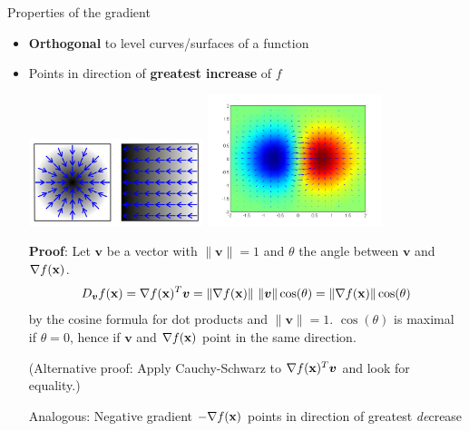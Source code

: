 \documentclass[11pt,compress,t,notes=noshow, xcolor=table]{beamer}
\begin{document}
\begin{vbframe}{Properties of the gradient}

\begin{itemize}
	\item \textbf{Orthogonal} to level curves/surfaces of a function
	\item Points in direction of \textbf{greatest increase} of $f$
	\begin{center}
		\includegraphics[width = 0.4\textwidth]{figure_man/gradient3.png} \includegraphics[width = 0.4\textwidth]{figure_man/gradient.png}
	\end{center}
	\begin{footnotesize}
    	\textbf{Proof}: Let $\bm{v}$ be a vector with $\|\bm{v}\|=1$ and $\theta$ the angle between $\bm{v}$ and $\nabla f(\mathbf{x})$. 
        \begin{equation*}
            D_{\bm{v}}f(\mathbf{x}) = \nabla f(\mathbf{x})^T \bm{v} = \|\nabla f(\mathbf{x})\|~\|\bm{v}\|\cos(\theta) = \|\nabla f(\mathbf{x})\| \cos(\theta)
        \end{equation*}
    	by the cosine formula for dot products and $\|\bm{v}\| = 1$.
        $\cos(\theta)$ is maximal if $\theta = 0$, hence if $\bm{v}$ and $\nabla f(\mathbf{x})$ point in the same direction.
        
    	(Alternative proof: Apply Cauchy-Schwarz to $\nabla f(\mathbf{x})^T \bm{v}$ and look for equality.)

        Analogous: Negative gradient $- \nabla f(\mathbf{x})$ points in direction of greatest \textit{de}crease
	\end{footnotesize}
\end{itemize}


\end{vbframe}
\end{document}
